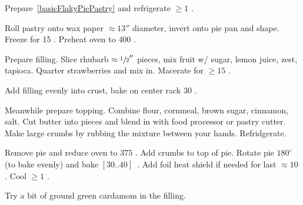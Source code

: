 \begin{preparation}
\item Prepare~\ref{basicFlakyPiePastry}  and
    refrigerate $\geq 1$ \hour.

\item Roll pastry onto wax paper $\approx 13''$ diameter, invert onto pie pan and shape.
    Freeze for 15 \minute.
    Preheat oven to $400$ \Fahrenheit.

\item Prepare filling.
    Slice rhubarb $\approx \sfrac{1}{2}''$ pieces, mix fruit w/ sugar, lemon
    juice, zest, tapioca.
    Quarter strawberries and mix in.
    Macerate for $\geq 15$ \minute.

\item Add filling evenly into crust, bake on center rack 30 \minute.

\item Meanwhile prepare topping.
    Combine flour, cornmeal, brown sugar, cinnamon, salt.
    Cut butter into pieces and blend in with food processor or pastry cutter.
    Make large crumbs by rubbing the mixture between your hands.
    Refridgerate.

\item Remove pie and reduce oven to 375 \Fahrenheit.
    Add crumbs to top of pie.
    Rotate pie $180^\circ$ (to bake evenly) and bake $[30..40]$~\minute.
    Add foil heat shield if needed for last $\approx 10$ \minute.
    Cool $\geq 1$ \hour.
\end{preparation}

\begin{variation}
\item Try a bit of ground green cardamom in the filling.
\end{variation}

\recipeend%
